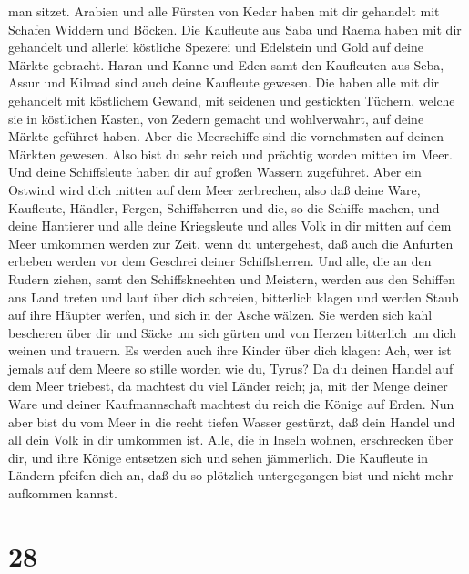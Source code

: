 man sitzet.  Arabien und alle Fürsten von Kedar haben mit
dir gehandelt mit Schafen Widdern und Böcken.  Die
Kaufleute aus Saba und Raema haben mit dir gehandelt und allerlei
köstliche Spezerei und Edelstein und Gold auf deine Märkte gebracht.
 Haran und Kanne und Eden samt den Kaufleuten aus Seba,
Assur und Kilmad sind auch deine Kaufleute gewesen.  Die
haben alle mit dir gehandelt mit köstlichem Gewand, mit seidenen und
gestickten Tüchern, welche sie in köstlichen Kasten, von Zedern gemacht
und wohlverwahrt, auf deine Märkte geführet haben.  Aber
die Meerschiffe sind die vornehmsten auf deinen Märkten gewesen. Also
bist du sehr reich und prächtig worden mitten im Meer.  Und
deine Schiffsleute haben dir auf großen Wassern zugeführet. Aber ein
Ostwind wird dich mitten auf dem Meer zerbrechen,  also daß
deine Ware, Kaufleute, Händler, Fergen, Schiffsherren und die, so die
Schiffe machen, und deine Hantierer und alle deine Kriegsleute und alles
Volk in dir mitten auf dem Meer umkommen werden zur Zeit, wenn du
untergehest,  daß auch die Anfurten erbeben werden vor dem
Geschrei deiner Schiffsherren.  Und alle, die an den Rudern
ziehen, samt den Schiffsknechten und Meistern, werden aus den Schiffen
ans Land treten  und laut über dich schreien, bitterlich
klagen und werden Staub auf ihre Häupter werfen, und sich in der Asche
wälzen.  Sie werden sich kahl bescheren über dir und Säcke
um sich gürten und von Herzen bitterlich um dich weinen und trauern.
 Es werden auch ihre Kinder über dich klagen: Ach, wer ist
jemals auf dem Meere so stille worden wie du, Tyrus?  Da du
deinen Handel auf dem Meer triebest, da machtest du viel Länder reich;
ja, mit der Menge deiner Ware und deiner Kaufmannschaft machtest du
reich die Könige auf Erden.  Nun aber bist du vom Meer in
die recht tiefen Wasser gestürzt, daß dein Handel und all dein Volk in
dir umkommen ist.  Alle, die in Inseln wohnen, erschrecken
über dir, und ihre Könige entsetzen sich und sehen jämmerlich.
 Die Kaufleute in Ländern pfeifen dich an, daß du so
plötzlich untergegangen bist und nicht mehr aufkommen kannst.

\hypertarget{section-27}{%
\section{28}\label{section-27}}


